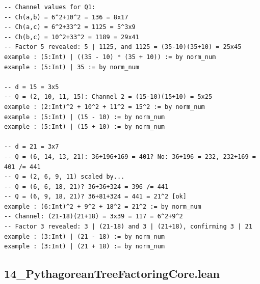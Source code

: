 \documentclass[11pt,openright,twoside]{book}
\theoremstyle{definition}
\begin{document}
\begin{lstlisting}[style=lean]
-- Channel values for Q1:
-- Ch(a,b) = 6^2+10^2 = 136 = 8x17
-- Ch(a,c) = 6^2+33^2 = 1125 = 5^3x9
-- Ch(b,c) = 10^2+33^2 = 1189 = 29x41
-- Factor 5 revealed: 5 | 1125, and 1125 = (35-10)(35+10) = 25x45
example : (5:Int) | ((35 - 10) * (35 + 10)) := by norm_num
example : (5:Int) | 35 := by norm_num

-- d = 15 = 3x5
-- Q = (2, 10, 11, 15): Channel 2 = (15-10)(15+10) = 5x25
example : (2:Int)^2 + 10^2 + 11^2 = 15^2 := by norm_num
example : (5:Int) | (15 - 10) := by norm_num
example : (5:Int) | (15 + 10) := by norm_num

-- d = 21 = 3x7
-- Q = (6, 14, 13, 21): 36+196+169 = 401? No: 36+196 = 232, 232+169 = 401 /= 441
-- Q = (2, 6, 9, 11) scaled by...
-- Q = (6, 6, 18, 21)? 36+36+324 = 396 /= 441
-- Q = (6, 9, 18, 21)? 36+81+324 = 441 = 21^2 [ok]
example : (6:Int)^2 + 9^2 + 18^2 = 21^2 := by norm_num
-- Channel: (21-18)(21+18) = 3x39 = 117 = 6^2+9^2
-- Factor 3 revealed: 3 | (21-18) and 3 | (21+18), confirming 3 | 21
example : (3:Int) | (21 - 18) := by norm_num
example : (3:Int) | (21 + 18) := by norm_num
\end{lstlisting}

\clearpage


\subsection*{14\_PythagoreanTreeFactoringCore.lean}
\label{lean:14_PythagoreanTreeFactoringCore}
\end{document}
